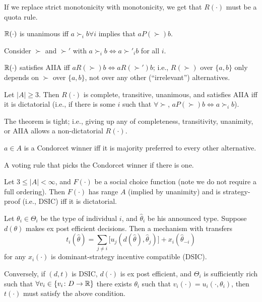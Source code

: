 \documentclass[8pt,letterpaper, landscape]{extarticle} %
\begin{document}
\begin{multicols}{3}
\begin{description}
If we replace strict monotonicity with monotonicity, we get that $ R(\cdot) $ must be a quota rule.

 $ \mathbb{R}( \cdot) $ is unanimous iff $ a \succ_i b \forall i $ implies that $ a P(\succ) b $.

 Consider $ \succ $ and $ \succ' $ with $ a \succ_i b \iff a \succ'_i b $ for all $ i $.

$ \mathbb{R}( \cdot) $ satisfies AIIA iff $ a R(\succ) b \iff a R(\succ') b $; i.e., $ R(\succ) $ over $ \{ a, b \} $ only depends on $ \succ $ over $ \{ a, b \} $, not over any other (``irrelevant'') alternatives.

 Let $ |A| \geq 3 $. Then $ R(\cdot) $ is complete, transitive, unanimous, and satisfies AIIA iff it is dictatorial (i.e., if there is some $ i $ such that $ \forall \succ $, $ a P(\succ) b \iff a \succ_i b $).

The theorem is tight; i.e., giving up any of completeness, transitivity, unanimity, or AIIA allows a non-dictatorial $ R(\cdot) $.

 $ a \in A $ is a Condorcet winner iff it is majority preferred to every other alternative.

 A voting rule that picks the Condorcet winner if there is one.

 Let $ 3 \leq |A| < \infty $, and $ F (\cdot) $ be a social choice function (note we do not require a full ordering). Then $ F ( \cdot ) $ has range $ A $ (implied by unanimity) and is strategy-proof (i.e., DSIC) iff it is dictatorial.

 Let $ \theta_i \in \Theta_i $ be the type of individual $ i $, and $ \hat{\theta}_i $ be his announced type. Suppose $ d(\theta) $ makes ex post efficient decisions. Then a mechanism with transfers
\[ t_i (\hat{\theta}) = \sum_{j \neq i} \bigl [ u_j (d(\hat{\theta}), \hat{\theta}_j) \bigr ] + x_i (\hat{\theta}_{-i}) \]
for any $ x_i (\cdot) $ is dominant-strategy incentive compatible (DSIC).

Conversely, if $ (d, t) $ is DSIC, $ d(\cdot) $ is ex post efficient, and $ \Theta_i $ is sufficiently rich such that $ \forall v_i \in \{v_i \colon D \to \mathbb{R} \} $ there exists $ \theta_i $ such that $ v_i (\cdot) = u_i (\cdot , \theta_i) $, then $ t (\cdot) $ must satisfy the above condition.


\end{description}
\end{multicols}
\end{document}
